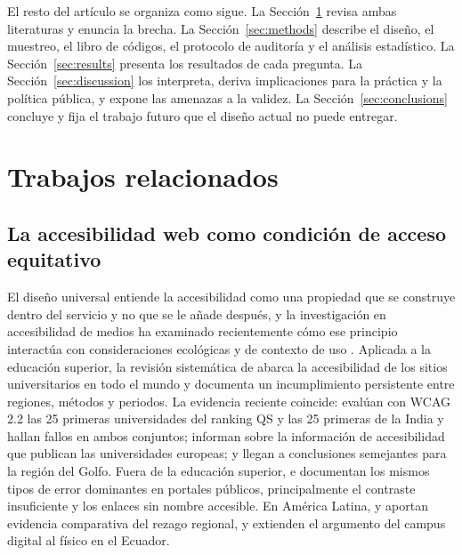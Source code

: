 \documentclass[pdflatex,sn-basic,Numbered]{sn-jnl}
\theoremstyle{thmstyleone}
\theoremstyle{thmstyletwo}
\theoremstyle{thmstylethree}
\begin{document}
El resto del art\'iculo se organiza como sigue. La Secci\'on~\ref{sec:related} revisa ambas literaturas y enuncia la brecha. La Secci\'on~\ref{sec:methods} describe el dise\~no, el muestreo, el libro de c\'odigos, el protocolo de auditor\'ia y el an\'alisis estad\'istico. La Secci\'on~\ref{sec:results} presenta los resultados de cada pregunta. La Secci\'on~\ref{sec:discussion} los interpreta, deriva implicaciones para la pr\'actica y la pol\'itica p\'ublica, y expone las amenazas a la validez. La Secci\'on~\ref{sec:conclusions} concluye y fija el trabajo futuro que el dise\~no actual no puede entregar.

\section{Trabajos relacionados}\label{sec:related}

\subsection{La accesibilidad web como condici\'on de acceso equitativo}\label{sec:related-a11y}

El dise\~no universal entiende la accesibilidad como una propiedad que se construye dentro del servicio y no que se le a\~nade despu\'es, y la investigaci\'on en accesibilidad de medios ha examinado recientemente c\'omo ese principio interact\'ua con consideraciones ecol\'ogicas y de contexto de uso \citep{hermosaramirez2025universal}. Aplicada a la educaci\'on superior, la revisi\'on sistem\'atica de \citet{campoverdemolina2023accessibility} abarca la accesibilidad de los sitios universitarios en todo el mundo y documenta un incumplimiento persistente entre regiones, m\'etodos y periodos. La evidencia reciente coincide: \citet{krittika2025accessibility} eval\'uan con WCAG 2.2 las 25 primeras universidades del ranking QS y las 25 primeras de la India y hallan fallos en ambos conjuntos; \citet{krejtz2025higher} informan sobre la informaci\'on de accesibilidad que publican las universidades europeas; y \citet{fakrudeen2025evaluation} llegan a conclusiones semejantes para la regi\'on del Golfo. Fuera de la educaci\'on superior, \citet{aljedaani2025egovernment} e \citet{iniesto2025service} documentan los mismos tipos de error dominantes en portales p\'ublicos, principalmente el contraste insuficiente y los enlaces sin nombre accesible. En Am\'erica Latina, \citet{acostavargas2020dataset} y \citet{acostavargas2020improve} aportan evidencia comparativa del rezago regional, y \citet{maldonadogarces2025physical} extienden el argumento del campus digital al f\'isico en el Ecuador.
\end{document}
